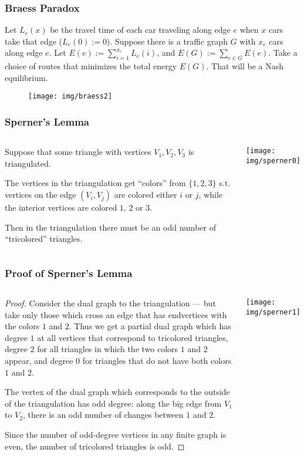 \documentclass[UTF8,aspectratio=43,11pt,colorlinks,compress,openany]{beamer}%
\begin{document}
\begin{frame}\frametitle{Braess Paradox}
Let $L_e(x)$ be the travel time of each car traveling along edge $e$ when $x$ cars take that edge ($L_e(0):=0$). Suppose there is a traffic graph $G$ with $x_e$ cars along edge $e$. Let $E(e):=\sum_{i=1}^{x_e} L_e(i)$, and $E(G):=\sum_{e\in G}E(e)$. Take a choice of routes that minimizes the total energy $E(G)$. That will be a Nash equilibrium.\vspace{-2pt}
\begin{figure}
	\texttt{[image: img/braess2]}
\end{figure}
\end{frame}

\begin{frame}\frametitle{Sperner's Lemma}
\begin{columns}
\begin{lemma}
Suppose that some triangle with vertices $V_1, V_2, V_3$ is triangulated.

The vertices in the triangulation get ``colors'' from $\{1,2,3\}$ s.t. vertices on the edge $(V_i,V_j)$ are colored either $i$ or $j$, while the interior vertices are colored $1$, $2$ or $3$.

Then in the triangulation there must be an odd number of ``tricolored'' triangles.
\end{lemma}
	\texttt{[image: img/sperner0]}
\end{columns}
\end{frame}

\begin{frame}\frametitle{Proof of Sperner's Lemma}
\begin{columns}
\vspace{-1ex}
\begin{proof}
Consider the dual graph to the triangulation --- but take only those which cross an edge that has endvertices with the colors $1$ and $2$. Thus we get a partial dual graph which has degree $1$ at all vertices that correspond to tricolored triangles, degree $2$ for all triangles in which the two colors $1$ and $2$ appear, and degree $0$ for triangles that do not have both colors $1$ and $2$.

The vertex of the dual graph which corresponds to the outside of the triangulation has odd degree: along the big edge from $V_1$ to $V_2$, there is an odd number of changes between $1$ and $2$.

Since the number of odd-degree vertices in any finite graph is even, the number of tricolored triangles is odd.
\end{proof}
	\texttt{[image: img/sperner1]}
\end{columns}
\end{frame}
\end{document}
